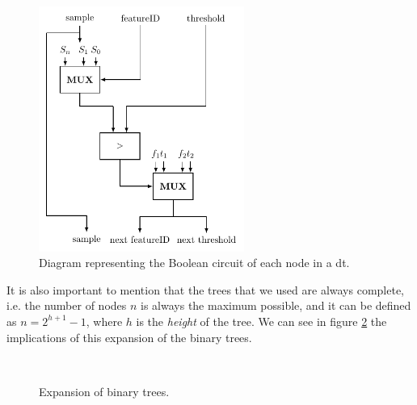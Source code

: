 \begin{figure}[!ht]
  \centering
  \includegraphics[width=0.60\textwidth]{images/decision_tree_node.pdf}
  \caption{Diagram representing the Boolean circuit of each node in a \ac{dt}.}
  \label{fig:DTNode}
\end{figure}


It is also important to mention that the trees that we used are always complete, i.e. the number of nodes $n$ is always the maximum possible, and it can be defined as $n=2^{h+1}-1$, where $h$ is the \textit{height} of the tree. We can see in figure \ref{fig:ExpansionBinaryTrees} the implications of this expansion of the binary trees.

\begin{figure}[H]
	\centering
	\mbox{
	}
	\caption{Expansion of binary trees.}
    \label{fig:ExpansionBinaryTrees}
\end{figure}


